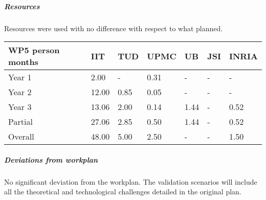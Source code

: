 
\subparagraph*{Resources}

Resources were used with no difference with respect to what planned. 

\begin{center}
\begin{tabular}{|C{1.5cm}|C{1.5cm}|C{1.5cm}|C{2cm}|C{2cm}|C{2cm}|C{2cm}|}
\hline
\footnotesize \textbf{WP5 person months}& \footnotesize \textbf{IIT}&\footnotesize \textbf{TUD}&\footnotesize \textbf{UPMC}& \footnotesize \textbf{UB} &\footnotesize \textbf{JSI} & \footnotesize \textbf{INRIA} \\ \hline
\footnotesize Year 1  &  2.00  & -    & 0.31 & -    & - & -     \\  \hline
\footnotesize Year 2  &  12.00 & 0.85 & 0.05 & -    & - & -     \\  \hline
\footnotesize Year 3  &  13.06 & 2.00 & 0.14 & 1.44 & - & 0.52 \\ \hline
\footnotesize Partial &  27.06 & 2.85 & 0.50 & 1.44 & - & 0.52 \\
\hline \hline
\footnotesize Overall &  48.00 & 5.00 & 2.50 & - & - & 1.50 \\ \hline
\end{tabular}
\end{center}

\subparagraph*{Deviations from workplan} 
No significant deviation from the workplan. The validation scenarios will include all the theoretical and technological challenges detailed in the original plan.
